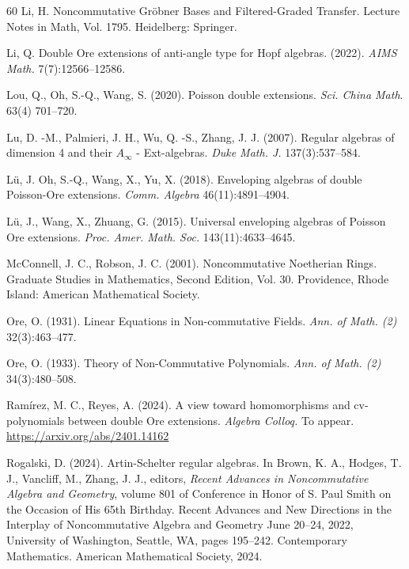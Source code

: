 \documentclass{amsart}
\theoremstyle{definition}
\theoremstyle{remark}
\numberwithin{equation}{section}
\begin{document}
\begin{thebibliography}{60}
 Li, H. Noncommutative Gr\"obner Bases and Filtered-Graded Transfer. Lecture Notes in Math, Vol. 1795. Heidelberg: Springer.

Li, Q. Double Ore extensions of anti-angle type for Hopf algebras. (2022). {\em AIMS Math.} 7(7):12566--12586.

 Lou, Q., Oh, S.-Q., Wang, S. (2020). Poisson double extensions. {\em Sci. China Math}. 63(4) 701--720.

 Lu, D. -M., Palmieri, J. H., Wu, Q. -S., Zhang, J. J. (2007). Regular algebras of dimension 4 and their $A_{\infty}$ - Ext-algebras. {\em Duke Math. J.} 137(3):537--584.

 L\"u, J. Oh, S.-Q., Wang, X., Yu, X. (2018). Enveloping algebras of double {P}oisson-{O}re extensions. {\em Comm. Algebra} 46(11):4891--4904.

 L\"u, J., Wang, X., Zhuang, G. (2015). Universal enveloping algebras of {P}oisson {O}re extensions. {\em Proc. Amer. Math. Soc.} 143(11):4633--4645.


 McConnell, J. C., Robson, J. C. (2001). Noncommutative Noetherian Rings. Graduate Studies in Mathematics, Second Edition, Vol. 30. Providence, Rhode Island: American Mathematical Society.

 Ore, O. (1931). Linear Equations in Non-commutative Fields. {\em Ann. of Math. {\rm(}2{\rm)}} {32}(3):463--477.

 Ore, O. (1933). Theory of Non-Commutative Polynomials. {\em Ann. of Math. {\rm(}2{\rm)}} {34}(3):480--508.

 Ram\'irez, M. C., Reyes, A. (2024). A view toward homomorphisms and cv-polynomials between double Ore extensions. {\em Algebra Colloq.} To appear.  \url{https://arxiv.org/abs/2401.14162}


 Rogalski, D. (2024). Artin-Schelter regular algebras. In Brown, K. A., Hodges, T. J., Vancliff, M., Zhang, J. J., editors, {\em Recent Advances in Noncommutative Algebra and Geometry}, volume 801 of Conference in Honor of S. Paul Smith on the Occasion of His 65th Birthday. Recent Advances and New Directions in the Interplay of Noncommutative Algebra and Geometry June 20–24, 2022, University of Washington, Seattle, WA, pages 195–242. Contemporary Mathematics. American Mathematical Society, 2024.


\end{thebibliography}
\end{document}
